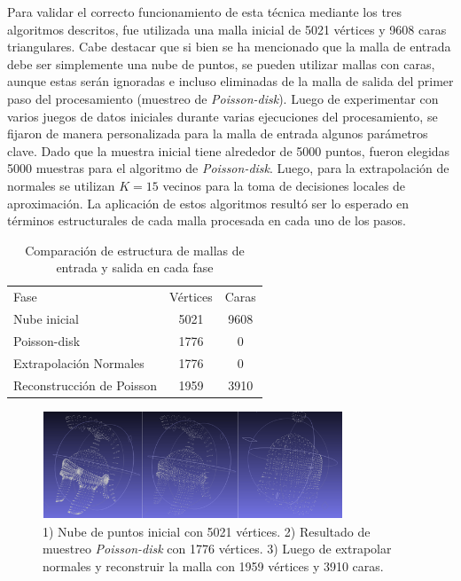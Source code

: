 Para validar el correcto funcionamiento de esta técnica mediante los tres algoritmos descritos, fue utilizada una malla inicial de 5021 vértices y 9608 caras triangulares. Cabe destacar que si bien se ha mencionado que la malla de entrada debe ser simplemente una nube de puntos, se pueden utilizar mallas con caras, aunque estas serán ignoradas e incluso eliminadas de la malla de salida del primer paso del procesamiento (muestreo de \emph{Poisson-disk}).
Luego de experimentar con varios juegos de datos iniciales durante varias ejecuciones del procesamiento, se fijaron de manera personalizada para la malla de entrada algunos parámetros clave. Dado que la muestra inicial tiene alrededor de 5000 puntos, fueron elegidas 5000 muestras para el algoritmo de \emph{Poisson-disk}. Luego, para la extrapolación de normales se utilizan $K=15$ vecinos para la toma de decisiones locales de aproximación.
La aplicación de estos algoritmos resultó ser lo esperado en términos estructurales de cada malla procesada en cada uno de los pasos.

\begin{table}
\begin{center}
\begin{tabular}{|l||cc|} \hline
  Fase & Vértices & Caras \\
  Nube inicial & 5021 & 9608 \\
  Poisson-disk & 1776 & 0 \\
  Extrapolación Normales & 1776 & 0 \\
  Reconstrucción de Poisson & 1959 & 3910 \\ \hline %
\end{tabular}
\caption{Comparación de estructura de mallas de entrada y salida en cada fase}
\end{center}
\end{table}

\begin{figure}[H]
  \centering
    \includegraphics[width=0.8\textwidth]{./Cap2_videomapping/malla-nubepuntos.png}
  \caption[Captura de Meshlab http://meshlab.sourceforge.net]{1) Nube de puntos inicial con 5021 vértices. 2) Resultado de muestreo \emph{Poisson-disk} con 1776 vértices. 3) Luego de extrapolar normales y reconstruir la malla con 1959 vértices y 3910 caras.}
  \label{fig:Mesh-Results}
\end{figure}
 